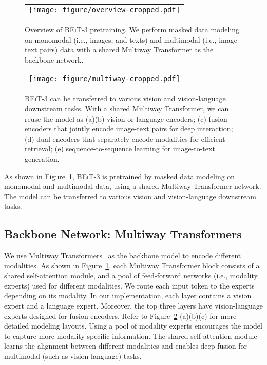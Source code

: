 \documentclass{article}
\newcommand\our{\textsc{BEiT-3}}
\newcommand\multiway{Multiway Transformers}
\begin{document}
\begin{figure}[t]
\begin{center}
\begin{tabular}{c}
\texttt{[image: figure/overview-cropped.pdf]}
\end{tabular}
\end{center}
\caption{
Overview of \our{} pretraining.
We perform masked data modeling on monomodal (i.e., images, and texts) and multimodal (i.e., image-text pairs) data with a shared Multiway Transformer as the backbone network.
}
\label{fig:overview}
\end{figure}

\begin{figure}[t]
\begin{center}
\begin{tabular}{c}
\texttt{[image: figure/multiway-cropped.pdf]}
\end{tabular}
\end{center}
\caption{
\our{} can be transferred to various vision and vision-language downstream tasks.
With a shared Multiway Transformer, we can reuse the model as (a)(b) vision or language encoders; (c) fusion encoders that jointly encode image-text pairs for deep interaction; (d) dual encoders that separately encode modalities for efficient retrieval; (e) sequence-to-sequence learning for image-to-text generation.
}
\label{fig:multiway}
\end{figure}

As shown in Figure~\ref{fig:overview}, \our{} is pretrained by masked data modeling on monomodal and multimodal data, using a shared Multiway Transformer network.
The model can be transferred to various vision and vision-language downstream tasks.

\subsection{Backbone Network: \multiway{}}

We use \multiway{}~\citep{vlmo} as the backbone model to encode different modalities.
As shown in Figure~\ref{fig:overview}, each Multiway Transformer block consists of a shared self-attention module, and a pool of feed-forward networks (i.e., modality experts) used for different modalities.
We route each input token to the experts depending on its modality.
In our implementation, each layer contains a vision expert and a language expert. Moreover, the top three layers have vision-language experts designed for fusion encoders.
Refer to Figure~\ref{fig:multiway} (a)(b)(c) for more detailed modeling layouts.
Using a pool of modality experts encourages the model to capture more modality-specific information.
The shared self-attention module learns the alignment between different modalities and enables deep fusion for multimodal (such as vision-language) tasks.
\end{document}
